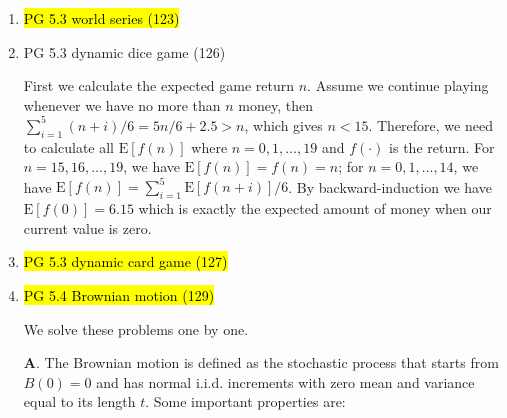 \documentclass[11pt]{article}
\newcommand{\E}{\text{E}}
\newenvironment{note}{\begin{enumerate}[leftmargin=1em,topsep=0pt,noitemsep]}{\end{enumerate}}
\newcommand{\solution}{\boxed{\textbf{SOLUTION}}\hspace{.5em}}
\begin{document}
\begin{spacing}{1.1}
\begin{note}
      \solution In the third throw we have $1/6$ probability for each result $x$, which leads to the expected value $\E[V_3]=3.5$, while we're not necessarily optimal to choose to throw the third time. Actually, our possible values for the second throw are
      $$
      V_2 = \begin{cases}
      3.5 & \text{if we get $1,2,3$},\\
      4 & \text{if we get $4$},\\
      5 & \text{if we get $5$},\\
      6 & \text{if we get $6$}\\
      \end{cases}
      $$
      and each has probability $1/6$, so $\E[V_2]=4.25$. Further, conditional on the first throw, we can actually have better choices, namely
      $$
      V_1 = \begin{cases}
      4.25 & \text{if we get $1,2,3,4$},\\
      5 & \text{if we get $5$},\\
      6 & \text{if we get $6$}\\
      \end{cases}
      $$
      and thus $\E[V_1]=14/3$.

\item \hl{PG 5.3 world series (123)}

\item PG 5.3 dynamic dice game (126)
      
      \solution First we calculate the expected game return $n$. Assume we continue playing whenever we have no more than $n$ money, then $\sum_{i=1}^5 (n+i)/6 = 5n/6 + 2.5 > n$, which gives $n < 15$. Therefore, we need to calculate all $\E[f(n)]$ where $n=0,1,\ldots,19$ and $f(\cdot)$ is the return. For $n=15,16,\ldots,19$, we have $\E[f(n)]=f(n)=n$; for $n=0,1,\ldots,14$, we have $\E[f(n)]=\sum_{i=1}^5 \E[f(n+i)]/6$. By backward-induction we have $\E[f(0)]=6.15$ which is exactly the expected amount of money when our current value is zero.

\item \hl{PG 5.3 dynamic card game (127)}

\item \hl{PG 5.4 Brownian motion (129)}

      \solution We solve these problems one by one. 

      \textbf{A}. The Brownian motion is defined as the stochastic process that starts from $B(0)=0$ and has normal i.i.d. increments with zero mean and variance equal to its length $t$. Some important properties are:


\end{note}
\end{spacing}
\end{document}
